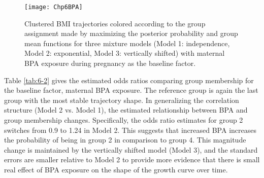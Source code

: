 \begin{figure}[h]
\centering
\texttt{[image: Chp6BPA]}
\label{fig:6-2}
\caption{Clustered BMI trajectories colored according to the group assignment made by maximizing the posterior probability and group mean functions for three mixture models (Model 1: independence, Model 2: exponential, Model 3: vertically shifted) with maternal BPA exposure during pregnancy as the baseline factor.}
\end{figure}

Table \ref{tab:6-2} gives the estimated odds ratios comparing group membership for the baseline factor, maternal BPA exposure. The reference group is again the last group with the most stable trajectory shape. In generalizing the correlation structure (Model 2 vs. Model 1), the estimated relationship between BPA and group membership changes. Specifically, the odds ratio estimates for group 2 switches from 0.9 to 1.24 in Model 2. This suggests that increased BPA increases the probability of being in group 2 in comparison to group 4. This magnitude change is maintained by the vertically shifted model (Model 3), and the standard errors are smaller relative to Model 2 to provide more evidence that there is small real effect of BPA exposure on the shape of the growth curve over time. 

